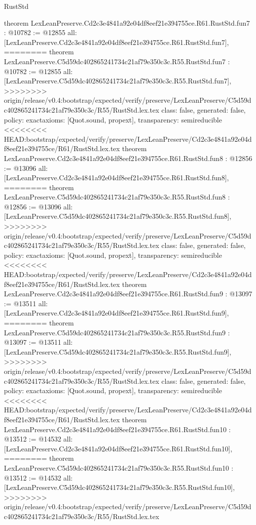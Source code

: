 \begin{lexlean}{RustStd}
\begin{coremodule}
{\begin{coremodule}
{{{{{{{{{theorem LexLeanPreserve.Cd2c3e4841a92e04df8eef21e394755ce.R61.RustStd.fun7 : @10782 := @12855 {
  all: [LexLeanPreserve.Cd2c3e4841a92e04df8eef21e394755ce.R61.RustStd.fun7],
========
theorem LexLeanPreserve.C5d59dc402865241734c21af79e350c3c.R55.RustStd.fun7 : @10782 := @12855 {
  all: [LexLeanPreserve.C5d59dc402865241734c21af79e350c3c.R55.RustStd.fun7],
>>>>>>>> origin/release/v0.4:bootstrap/expected/verify/preserve/LexLeanPreserve/C5d59dc402865241734c21af79e350c3c/R55/RustStd.lex.tex
  class: false,
  generated: false,
  policy: exact{axioms: [Quot.sound, propext]},
  transparency: semireducible
}
<<<<<<<< HEAD:bootstrap/expected/verify/preserve/LexLeanPreserve/Cd2c3e4841a92e04df8eef21e394755ce/R61/RustStd.lex.tex
theorem LexLeanPreserve.Cd2c3e4841a92e04df8eef21e394755ce.R61.RustStd.fun8 : @12856 := @13096 {
  all: [LexLeanPreserve.Cd2c3e4841a92e04df8eef21e394755ce.R61.RustStd.fun8],
========
theorem LexLeanPreserve.C5d59dc402865241734c21af79e350c3c.R55.RustStd.fun8 : @12856 := @13096 {
  all: [LexLeanPreserve.C5d59dc402865241734c21af79e350c3c.R55.RustStd.fun8],
>>>>>>>> origin/release/v0.4:bootstrap/expected/verify/preserve/LexLeanPreserve/C5d59dc402865241734c21af79e350c3c/R55/RustStd.lex.tex
  class: false,
  generated: false,
  policy: exact{axioms: [Quot.sound, propext]},
  transparency: semireducible
}
<<<<<<<< HEAD:bootstrap/expected/verify/preserve/LexLeanPreserve/Cd2c3e4841a92e04df8eef21e394755ce/R61/RustStd.lex.tex
theorem LexLeanPreserve.Cd2c3e4841a92e04df8eef21e394755ce.R61.RustStd.fun9 : @13097 := @13511 {
  all: [LexLeanPreserve.Cd2c3e4841a92e04df8eef21e394755ce.R61.RustStd.fun9],
========
theorem LexLeanPreserve.C5d59dc402865241734c21af79e350c3c.R55.RustStd.fun9 : @13097 := @13511 {
  all: [LexLeanPreserve.C5d59dc402865241734c21af79e350c3c.R55.RustStd.fun9],
>>>>>>>> origin/release/v0.4:bootstrap/expected/verify/preserve/LexLeanPreserve/C5d59dc402865241734c21af79e350c3c/R55/RustStd.lex.tex
  class: false,
  generated: false,
  policy: exact{axioms: [Quot.sound, propext]},
  transparency: semireducible
}
<<<<<<<< HEAD:bootstrap/expected/verify/preserve/LexLeanPreserve/Cd2c3e4841a92e04df8eef21e394755ce/R61/RustStd.lex.tex
theorem LexLeanPreserve.Cd2c3e4841a92e04df8eef21e394755ce.R61.RustStd.fun10 : @13512 := @14532 {
  all: [LexLeanPreserve.Cd2c3e4841a92e04df8eef21e394755ce.R61.RustStd.fun10],
========
theorem LexLeanPreserve.C5d59dc402865241734c21af79e350c3c.R55.RustStd.fun10 : @13512 := @14532 {
  all: [LexLeanPreserve.C5d59dc402865241734c21af79e350c3c.R55.RustStd.fun10],
>>>>>>>> origin/release/v0.4:bootstrap/expected/verify/preserve/LexLeanPreserve/C5d59dc402865241734c21af79e350c3c/R55/RustStd.lex.tex
}}}}}}}}}}}}}}
\end{coremodule}}
\end{coremodule}
\end{lexlean}
